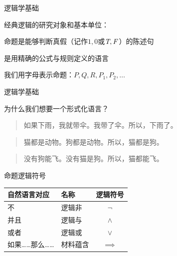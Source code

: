 \documentclass{zhslides}
\begin{document}
\begin{frame}{逻辑学基础}
  \bit
    \item 经典逻辑的研究对象和基本单位：
    \item 命题是能够判断真假（记作$1, 0$或$\textit{T}, \textit{F}\hspace{0.1em}$）的陈述句
    \item {}是用精确的公式与规则定义的语言
    \item 我们用字母表示命题：$P, Q, R, P_1, P_2, \dots$
  \eit
\end{frame}


\begin{frame}[t]{逻辑学基础}
  
  \vspace{2em}
  \begin{brainstorm*}{}
    为什么我们想要一个形式化语言？
  \end{brainstorm*}
  \vspace{1em}
  
  \begin{quote}
    如果下雨，我就带伞。我带了伞。所以，下雨了。
  \end{quote}
  \vspace{1em}\pause
  \begin{quote}
    猫都是动物。狗都是动物。所以，猫都是狗。
  \end{quote}
  \vspace{1em}\pause
  \begin{quote}
    没有狗能飞。没有猫是狗。所以，猫都能飞。
  \end{quote}

\end{frame}


\begin{frame}{命题逻辑符号}
  
  \begin{table}[h]
  \centering
  {\renewcommand{\arraystretch}{1.2}
  \begin{tabular}{llc}
    \textbf{自然语言对应} & \textbf{名称} & \textbf{逻辑符号} \\\hline
    不 & 逻辑非 & $\neg$ \\\pause
    并且 & 逻辑与 & $\land$ \\\pause
    或者 & 逻辑或 & $\lor$ \\\pause
    如果……那么…… & 材料蕴含 & $\implies$
  \end{tabular}
  }
  \end{table}
  
\end{frame}
\end{document}

